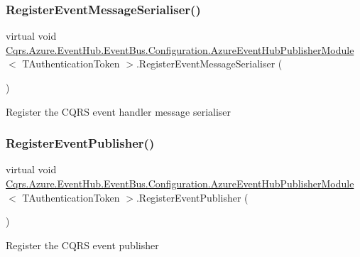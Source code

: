 \subsubsection{\texorpdfstring{Register\+Event\+Message\+Serialiser()}{RegisterEventMessageSerialiser()}}
{\footnotesize\ttfamily virtual void \hyperlink{classCqrs_1_1Azure_1_1EventHub_1_1EventBus_1_1Configuration_1_1AzureEventHubPublisherModule}{Cqrs.\+Azure.\+Event\+Hub.\+Event\+Bus.\+Configuration.\+Azure\+Event\+Hub\+Publisher\+Module}$<$ T\+Authentication\+Token $>$.Register\+Event\+Message\+Serialiser (\begin{DoxyParamCaption}{ }\end{DoxyParamCaption})\hspace{0.3cm}{\ttfamily [virtual]}}



Register the C\+Q\+RS event handler message serialiser 

\mbox{\label{classCqrs_1_1Azure_1_1EventHub_1_1EventBus_1_1Configuration_1_1AzureEventHubPublisherModule_a86c95fe05f75c63d85a52a3052f3b016_a86c95fe05f75c63d85a52a3052f3b016}} 
\subsubsection{\texorpdfstring{Register\+Event\+Publisher()}{RegisterEventPublisher()}}
{\footnotesize\ttfamily virtual void \hyperlink{classCqrs_1_1Azure_1_1EventHub_1_1EventBus_1_1Configuration_1_1AzureEventHubPublisherModule}{Cqrs.\+Azure.\+Event\+Hub.\+Event\+Bus.\+Configuration.\+Azure\+Event\+Hub\+Publisher\+Module}$<$ T\+Authentication\+Token $>$.Register\+Event\+Publisher (\begin{DoxyParamCaption}{ }\end{DoxyParamCaption})\hspace{0.3cm}{\ttfamily [virtual]}}



Register the C\+Q\+RS event publisher 

